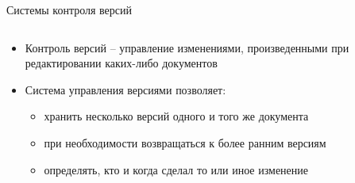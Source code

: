 \begin{frame}{Системы контроля версий}
      \begin{columns}
            \begin{column}{0.6\textwidth}
                  \begin{itemize}
                        \item
                              Контроль версий -- управление изменениями, произведенными при редактировании каких-либо документов
                        \item
                              Система управления версиями позволяет:
                              \begin{itemize}
                                  \item
                                        хранить несколько версий одного и того же документа
                                  \item
                                        при необходимости возвращаться к более ранним версиям
                                  \item
                                        определять, кто и когда сделал то или иное изменение
                              \end{itemize}
                    \end{itemize}
            \end{column}
            \begin{column}{0.4\textwidth}

\end{column}
\end{columns}
\end{frame}
